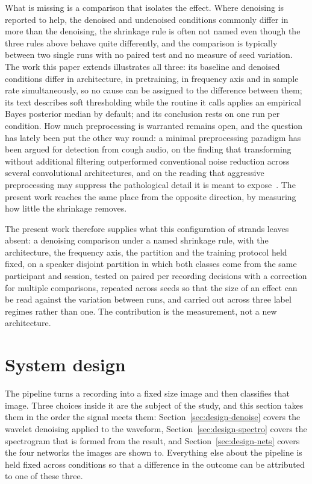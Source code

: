 \documentclass{ieeeaccess}
\begin{document}
What is missing is a comparison that isolates the effect. Where denoising is reported to
help, the denoised and undenoised conditions commonly differ in more than the denoising,
the shrinkage rule is often not named even though the three rules above behave quite
differently, and the comparison is typically between two single runs with no paired test
and no measure of seed variation. The work this paper extends illustrates all three: its
baseline and denoised conditions differ in architecture, in pretraining, in frequency axis
and in sample rate simultaneously, so no cause can be assigned to the difference between
them; its text describes soft thresholding while the routine it calls applies an empirical
Bayes posterior median by default; and its conclusion rests on one run per condition. How much preprocessing is warranted remains open, and the
question has lately been put the other way round: a minimal preprocessing
paradigm has been argued for detection from cough audio, on the finding that
transforming without additional filtering outperformed conventional noise
reduction across several convolutional architectures, and on the reading that
aggressive preprocessing may suppress the pathological detail it is meant to
expose~\cite{lim2026}. The present work reaches the same place from the
opposite direction, by measuring how little the shrinkage removes.

The present work therefore supplies what this configuration of strands leaves absent: a
denoising comparison under a named shrinkage rule, with the architecture, the frequency
axis, the partition and the training protocol held fixed, on a speaker disjoint partition
in which both classes come from the same participant and session, tested on paired per
recording decisions with a correction for multiple comparisons, repeated across seeds so
that the size of an effect can be read against the variation between runs, and carried
out across three label regimes rather than one. The contribution is the measurement, not
a new architecture.

\section{System design}\label{sec:design}

The pipeline turns a recording into a fixed size image and then classifies that image.
Three choices inside it are the subject of the study, and this section takes them in the
order the signal meets them: Section~\ref{sec:design-denoise} covers the wavelet
denoising applied to the waveform, Section~\ref{sec:design-spectro} covers the
spectrogram that is formed from the result, and Section~\ref{sec:design-nets} covers the
four networks the images are shown to. Everything else about the pipeline is held fixed
across conditions so that a difference in the outcome can be attributed to one of these
three.
\end{document}
